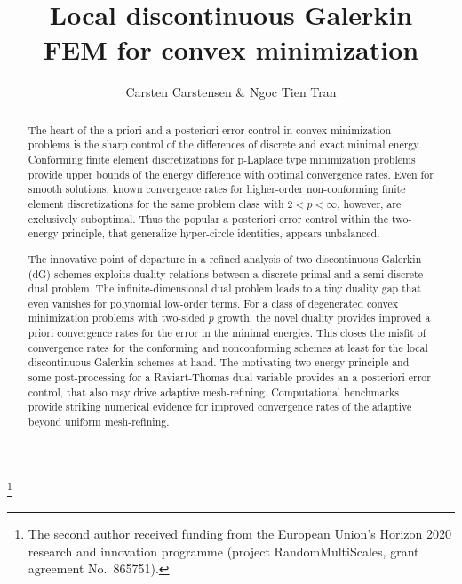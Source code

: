 \documentclass[a4paper]{amsart}
\numberwithin{equation}{section}
\theoremstyle{remark}
\begin{document}
\title[LDG for convex minimization]{Local discontinuous Galerkin \\ FEM for convex minimization}
\author[C.~Carstensen, N.~T.~Tran]{Carsten Carstensen \& Ngoc Tien Tran}
\thanks{The second author received funding from the European Union's Horizon 2020 
research and innovation programme (project RandomMultiScales, grant agreement No.~865751).}
\address[C.~Carstensen]{%
	Humboldt-Uni\-ver\-si\-t\"at zu Berlin,
	10117 Berlin, Germany}
\address[N.~T.~Tran]{Universit\"at Augsburg, 86159 Augsburg, Germany}
\begin{abstract}
The heart of the a priori and a posteriori error control in convex minimization problems 
    is the sharp control of the differences of discrete and exact minimal 
    energy. Conforming finite element discretizations  for p-Laplace type minimization problems
    provide upper bounds of the energy difference with optimal convergence rates.
    Even for smooth solutions, known convergence rates for higher-order non-conforming 
    finite element discretizations for the same problem class with $2 < p < \infty$,  however,  are exclusively 
    suboptimal. Thus the popular a posteriori 
    error control within the two-energy principle, that generalize hyper-circle identities, 
    appears unbalanced. 
     
The innovative point of departure in a refined analysis of two discontinuous Galerkin 
    (dG) schemes exploits duality relations between a discrete 
    primal and a semi-discrete dual problem. The infinite-dimensional dual problem
    leads to a tiny duality gap that even vanishes for polynomial low-order terms.
    For a class of degenerated convex minimization problems with two-sided $p$ growth,
    the novel duality
    provides improved a priori convergence rates for the error in the minimal energies. 
    This closes the misfit of convergence rates for the conforming and nonconforming 
    schemes at least for the local discontinuous Galerkin schemes at hand.
    The  motivating two-energy principle and some post-processing for a Raviart-Thomas
    dual variable provides an a posteriori error control, that also 
    may drive adaptive mesh-refining. Computational benchmarks  provide striking   
    numerical evidence for improved convergence rates of the adaptive beyond uniform
    mesh-refining.
\end{abstract}
\end{document}
